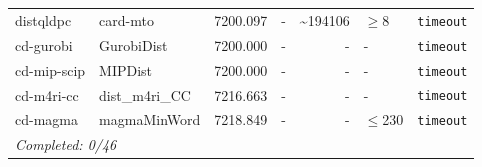 \begin{longtable}{llrrrl p{}}
distqldpc & card-mto & 7200.097 & - & \textasciitilde{}194106 & $\geq$8 & \texttt{timeout} \\
cd-gurobi & GurobiDist & 7200.000 & - & - & - & \texttt{timeout} \\
cd-mip-scip & MIPDist & 7200.000 & - & - & - & \texttt{timeout} \\
cd-m4ri-cc & dist\_m4ri\_CC & 7216.663 & - & - & - & \texttt{timeout} \\
cd-magma & magmaMinWord & 7218.849 & - & - & $\leq$230 & \texttt{timeout} \\
\midrule
\multicolumn{7}{l}{\textit{Completed: 0/46}} \\
\end{longtable}
